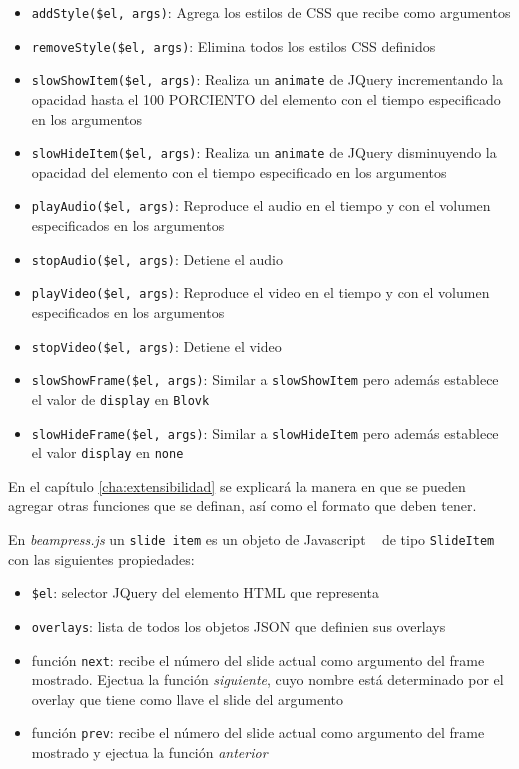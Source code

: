			\begin{itemize}
				\item \texttt{addStyle(\$el, args)}: Agrega los estilos de CSS que recibe como argumentos
				\item \texttt{removeStyle(\$el, args)}: Elimina todos los estilos CSS definidos
				\item \texttt{slowShowItem(\$el, args)}: Realiza un \texttt{animate} de JQuery incrementando la opacidad hasta el 100 PORCIENTO del elemento con el tiempo especificado en los argumentos
				\item \texttt{slowHideItem(\$el, args)}: Realiza un \texttt{animate} de JQuery disminuyendo la opacidad del elemento con el tiempo especificado en los argumentos
				\item \texttt{playAudio(\$el, args)}: Reproduce el audio en el tiempo y con el volumen especificados en los argumentos
				\item \texttt{stopAudio(\$el, args)}: Detiene el audio
				\item \texttt{playVideo(\$el, args)}: Reproduce el video en el tiempo y con el volumen especificados en los argumentos
				\item \texttt{stopVideo(\$el, args)}: Detiene el video
				\item \texttt{slowShowFrame(\$el, args)}: Similar a \texttt{slowShowItem} pero además establece el valor de \texttt{display} en \texttt{Blovk}
				\item \texttt{slowHideFrame(\$el, args)}: Similar a \texttt{slowHideItem} pero además establece el valor \texttt{display} en \texttt{none}				
			\end{itemize}
			En el capítulo \ref{cha:extensibilidad} se explicará la manera en que se pueden agregar otras funciones que se definan, así como el formato que deben tener.

			En \textit{beampress.js} un \texttt{slide item} es un objeto de Javascript ~\cite{book:1047044} de tipo \texttt{SlideItem} con las siguientes propiedades:

			\begin{itemize}
			\label{it:slide_item}
			 	\item \texttt{\$el}: selector JQuery del elemento HTML que representa
			 	\item \texttt{overlays}: lista de todos los objetos JSON que definien sus overlays
			 	\item función \texttt{next}: recibe el número del slide actual como argumento del frame mostrado. Ejectua la función \textit{siguiente}, cuyo nombre está determinado por el overlay que tiene como llave el slide del argumento 
			 	\item función \texttt{prev}: recibe el número del slide actual como argumento del frame mostrado y ejectua la función \textit{anterior}			 	
			 \end{itemize} 
				
